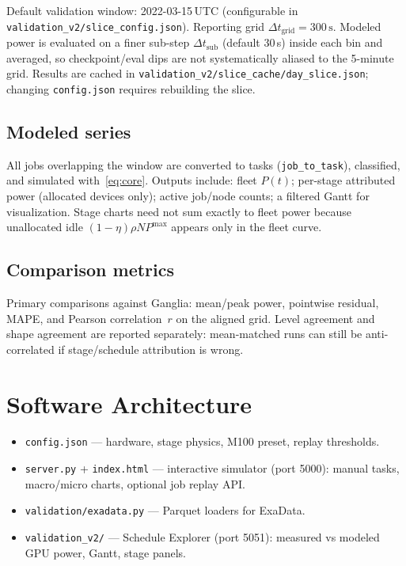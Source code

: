 \documentclass[10pt,a4paper,twocolumn]{article}
\begin{document}
Default validation window: 2022-03-15\,UTC (configurable in
\texttt{validation\_v2/slice\_config.json}). Reporting grid
$\Delta t_{\mathrm{grid}}=300\,\mathrm{s}$. Modeled power is evaluated on a
finer sub-step $\Delta t_{\mathrm{sub}}$ (default 30\,s) inside each bin and
averaged, so checkpoint/eval dips are not systematically aliased to the
5-minute grid. Results are cached in
\texttt{validation\_v2/slice\_cache/day\_slice.json}; changing
\texttt{config.json} requires rebuilding the slice.

\subsection{Modeled series}

All jobs overlapping the window are converted to tasks
(\texttt{job\_to\_task}), classified, and simulated with~\eqref{eq:core}.
Outputs include: fleet $P(t)$; per-stage attributed power (allocated devices
only); active job/node counts; a filtered Gantt for visualization. Stage
charts need not sum exactly to fleet power because unallocated idle
$(1-\eta)\rho N P^{\max}$ appears only in the fleet curve.

\subsection{Comparison metrics}

Primary comparisons against Ganglia:
mean/peak power, pointwise residual, MAPE, and Pearson correlation~$r$ on
the aligned grid. Level agreement and shape agreement are reported separately:
mean-matched runs can still be anti-correlated if stage/schedule attribution
is wrong.

\section{Software Architecture}

\begin{itemize}[leftmargin=1.2em,itemsep=1pt,topsep=2pt]
  \item \texttt{config.json} --- hardware, stage physics, M100 preset, replay
        thresholds.
  \item \texttt{server.py} + \texttt{index.html} --- interactive simulator
        (port 5000): manual tasks, macro/micro charts, optional job replay API.
  \item \texttt{validation/exadata.py} --- Parquet loaders for ExaData.
  \item \texttt{validation\_v2/} --- Schedule Explorer (port 5051):
        measured vs modeled GPU power, Gantt, stage panels.
\end{itemize}
\end{document}
